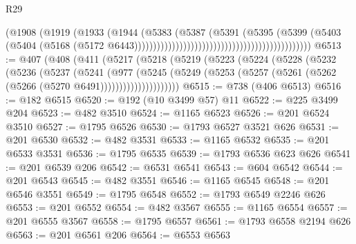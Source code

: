 \begin{lexlean}{R29}
\begin{coremodule}
                                                                        (@1908
                                                                          (@1919
                                                                            (@1933
                                                                              (@1944
                                                                                (@5383
                                                                                  (@5387
                                                                                    (@5391
                                                                                      (@5395
                                                                                        (@5399
                                                                                          (@5403
                                                                                            (@5404
                                                                                              (@5168
                                                                                                (@5172
                                                                                                  @6443)))))))))))))))))))))))))))))))))))))))))))))))
@6513 := @407
    (@408
      (@411
        (@5217
          (@5218
            (@5219
              (@5223
                (@5224
                  (@5228
                    (@5232
                      (@5236
                        (@5237
                          (@5241
                            (@977
                              (@5245
                                (@5249
                                  (@5253
                                    (@5257 (@5261 (@5262 (@5266 (@5270 @6491)))))))))))))))))))))
@6515 := @738 (@406 @6513)
@6516 := @182 @6515
@6520 := @192 (@10 @3499 @57) @11
@6522 := @225 @3499 @204
@6523 := @482 @3510
@6524 := @1165 @6523
@6526 := @201 @6524 @3510
@6527 := @1795 @6526
@6530 := @1793 @6527 @3521 @626
@6531 := @201 @6530
@6532 := @482 @3531
@6533 := @1165 @6532
@6535 := @201 @6533 @3531
@6536 := @1795 @6535
@6539 := @1793 @6536 @623 @626
@6541 := @201 @6539 @206
@6542 := @6531 @6541
@6543 := @604 @6542
@6544 := @201 @6543
@6545 := @482 @3551
@6546 := @1165 @6545
@6548 := @201 @6546 @3551
@6549 := @1795 @6548
@6552 := @1793 @6549 @2246 @626
@6553 := @201 @6552
@6554 := @482 @3567
@6555 := @1165 @6554
@6557 := @201 @6555 @3567
@6558 := @1795 @6557
@6561 := @1793 @6558 @2194 @626
@6563 := @201 @6561 @206
@6564 := @6553 @6563

\end{coremodule}
\end{lexlean}
